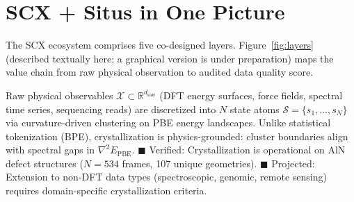 \documentclass[12pt,a4paper]{article}
\begin{document}
\vspace{6pt}

\section{SCX + Situs in One Picture}

The SCX ecosystem comprises five co-designed layers. Figure~\ref{fig:layers} (described textually here; a graphical version is under preparation) maps the value chain from raw physical observation to audited data quality score.

\begin{description}[leftmargin=2cm,style=nextline]
\item[\textbf{Layer 1 — State Crystallization}.] Raw physical observables $\mathcal{X} \subset \mathbb{R}^{d_{\text{raw}}}$ (DFT energy surfaces, force fields, spectral time series, sequencing reads) are discretized into $N$ state atoms $\mathcal{S} = \{s_1,\ldots,s_N\}$ via curvature-driven clustering on PBE energy landscapes. Unlike statistical tokenization (BPE), crystallization is physics-grounded: cluster boundaries align with spectral gaps in $\nabla^2 E_{\text{PBE}}$. \textcolor{verified}{$\blacksquare$ Verified}: Crystallization is operational on AlN defect structures ($N = 534$ frames, 107 unique geometries). \textcolor{projected}{$\blacksquare$ Projected}: Extension to non-DFT data types (spectroscopic, genomic, remote sensing) requires domain-specific crystallization criteria.


\end{description}
\end{document}
